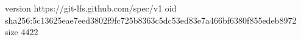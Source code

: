 version https://git-lfs.github.com/spec/v1
oid sha256:5c13625eae7eed3802f9fc725b8363c5dc53ed83e7a466bf6380f855edeb8972
size 4422
